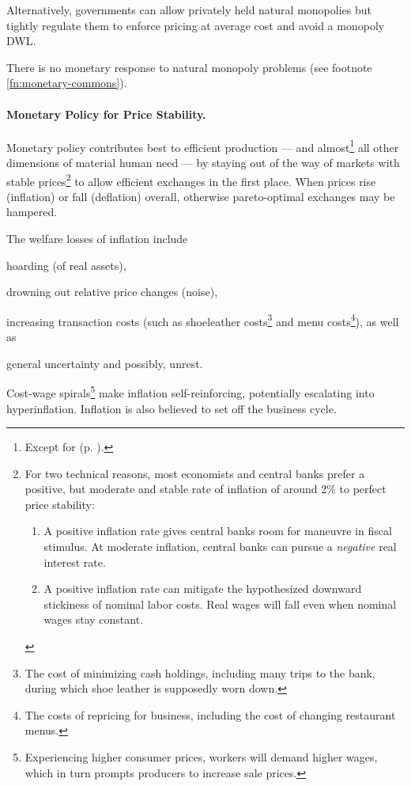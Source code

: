 Alternatively, governments can allow privately held natural monopolies but tightly regulate them to enforce pricing at average cost and avoid a monopoly \gls{DWL}.

There is no monetary response to natural monopoly problems (see footnote \ref{fn:monetary-commons}).

\paragraph{Monetary Policy for Price Stability.}  \label{sec:price-stability} Monetary policy contributes best to efficient production --- and almost\footnote{
	Except for  (p. \pageref{sec:monetary-stimulus}).}
all other dimensions of material human need --- by staying out of the way of markets with stable prices\footnote{
	For two technical reasons, most economists and central banks prefer a positive, but moderate and stable rate of inflation of around 2\% to perfect price stability:
	\begin{enumerate}
		\item A positive inflation rate gives central banks room for maneuvre in fiscal stimulus. At moderate inflation, central banks can pursue a \emph{negative} real interest rate. 
		\item A positive inflation rate can mitigate the hypothesized downward stickiness of nominal labor costs. Real wages will fall even when nominal wages stay constant.%
	\end{enumerate}} 
to allow efficient exchanges in the first place. When prices rise (inflation) or fall (deflation) overall, otherwise pareto-optimal exchanges may be hampered. 

The welfare losses of inflation include \begin{inparaenum}
	\item hoarding (of real assets), 
	\item drowning out relative price changes (noise), 
	\item increasing transaction costs (such as shoeleather costs\footnote{
		The cost of minimizing cash holdings, including many trips to the bank, during which shoe leather is supposedly worn down.} 
		and menu costs\footnote{
			The costs of repricing for business, including the cost of changing restaurant menus.}), as well as 
	\item general uncertainty and possibly, unrest. 
	\end{inparaenum}
Cost-wage spirals\footnote{Experiencing higher consumer prices, workers will demand higher wages, which in turn prompts producers to increase sale prices.} make inflation self-reinforcing, potentially escalating into hyperinflation. Inflation is also believed to set off the business cycle. %

